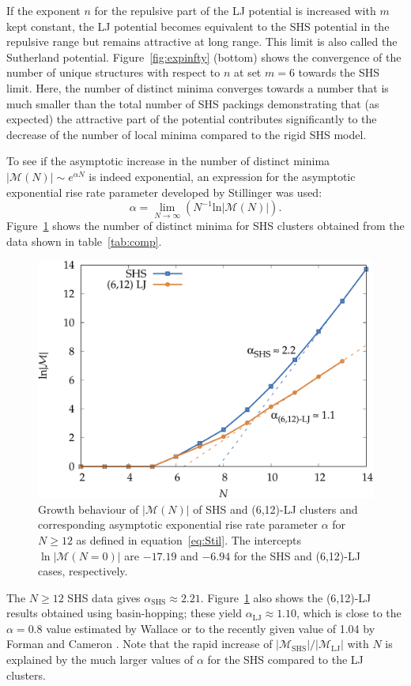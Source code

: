 If the exponent $n$ for the repulsive part of the \ac{LJ} potential is increased
with $m$ kept constant, the \ac{LJ} potential becomes equivalent to the \ac{SHS}
potential in the repulsive range but remains attractive at long range. This
limit is also called the Sutherland potential. Figure~\ref{fig:expinfty}
(bottom) shows the convergence of the number of unique structures with respect
to $n$ at set $m=6$ towards the \ac{SHS} limit. Here, the number of distinct
minima converges towards a number that is much smaller than the total number of
\ac{SHS} packings demonstrating that (as expected) the attractive part of the
potential contributes significantly to the decrease of the number of local
minima compared to the rigid \ac{SHS} model.

To see if the asymptotic increase in the number of distinct minima
$|\mathcal{M}(N)| \sim e^{\alpha N}$ is indeed exponential, an expression for
the asymptotic exponential rise rate parameter developed by Stillinger was
used:\autocite{Stillinger_Exponentialmultiplicityinherent_1999}
%
\begin{equation} \label{eq:Stil}
\alpha = \lim_{N\rightarrow \infty} \left( N^{-1} \mathrm{ln} |\mathcal{M}(N)| \right).
\end{equation}
%
Figure~\ref{fig:asympt} shows the number of distinct minima for \ac{SHS}
clusters obtained from the data shown in table~\ref{tab:comp}. 
%
\begin{figure}[htb]
    \centering
    \includegraphics[width=0.8\columnwidth]{kslj/growth.pdf}
    \caption{Growth behaviour of $|\mathcal{M}(N)|$ of \acs{SHS} and (6,12)-\acs{LJ}
    clusters and corresponding asymptotic exponential rise rate parameter
    $\alpha$ for $N \geq 12$ as defined in equation~\eqref{eq:Stil}.  The
    intercepts $\ln|\mathcal{M}(N=0)|$ are $-17.19$ and $-6.94$ for the \acs{SHS}
    and (6,12)-\acs{LJ} cases, respectively.}
    \label{fig:asympt}
\end{figure}
%
The $N \geq 12$ \ac{SHS} data gives $\alpha_\mathrm{SHS}\approx 2.21$.
Figure~\ref{fig:asympt} also shows the (6,12)-\ac{LJ} results obtained using
basin-hopping; these yield $\alpha_\mathrm{LJ}\approx 1.10$, which is close to
the $\alpha=0.8$ value estimated by Wallace \autocite{Wallace-1997} or to the
recently given value of 1.04 by Forman and Cameron
\autocite{Forman_ModelingAggregationProcesses_2017}. Note that the rapid
increase of $|\mathcal{M}_\mathrm{SHS}|/|\mathcal{M}_\mathrm{LJ}|$ with $N$ is
explained by the much larger values of $\alpha$ for the \ac{SHS} compared to the
\ac{LJ} clusters.

